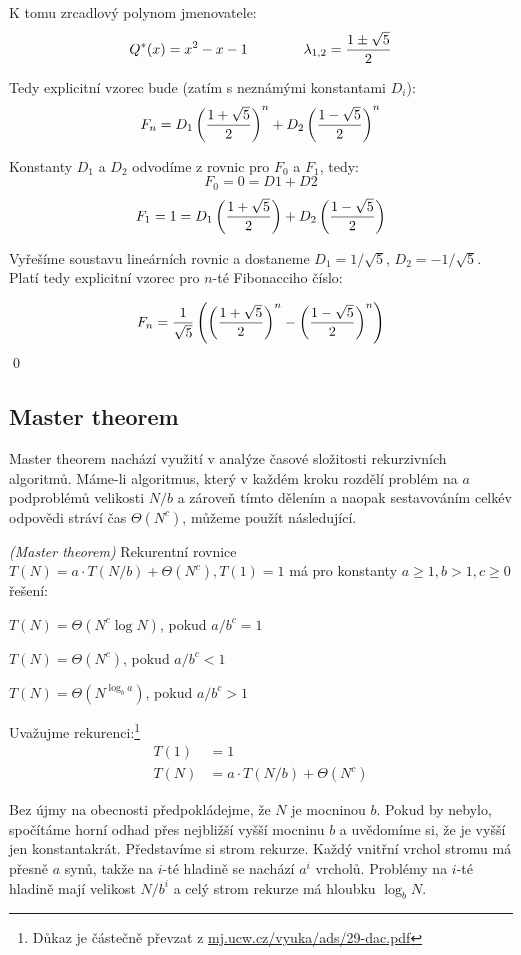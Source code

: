 K tomu zrcadlový polynom jmenovatele:
$$Q^*(x) = x^2-x-1\qquad\qquad\lambda_{1,2} = {1\pm\sqrt 5\over 2}$$

Tedy explicitní vzorec bude (zatím s neznámými konstantami $D_i$):
$$F_n = D_1\left({1+\sqrt 5\over 2}\right)^n + D_2\left({1-\sqrt 5\over 2}\right)^n$$

Konstanty $D_1$ a $D_2$ odvodíme z rovnic pro $F_0$ a $F_1$, tedy:
$$F_0 = 0 = D1 + D2$$
$$F_1 = 1 = D_1\left({1+\sqrt 5\over 2}\right) + D_2\left({1-\sqrt 5\over 2}\right)$$

Vyřešíme soustavu lineárních rovnic a dostaneme $D_1 = 1/\sqrt 5$, $D_2 =
-1/\sqrt 5$. Platí tedy explicitní vzorec pro $n$-té Fibonacciho číslo:

$$F_n = {1\over\sqrt 5}\left(\left({1+\sqrt 5\over 2}\right)^n - \left({1-\sqrt 5\over 2}\right)^n\right)$$
\qed

\subsection{Master theorem}

Master theorem nachází využití v analýze časové složitosti rekurzivních
algoritmů. Máme-li algoritmus, který v každém kroku rozdělí problém na $a$
podproblémů velikosti $N/b$ a zároveň tímto dělením a naopak sestavováním
celkév odpovědi stráví čas $\Theta(N^c)$, můžeme použít následující.

\vt \emph{(Master theorem)} Rekurentní rovnice $T(N) = a\cdot T(N/b) + \Theta(N^c), T(1) = 1$ má pro konstanty $a \ge 1, b > 1, c\ge 0$ řešení:
\begin{itemize*}
\item $T(N) = \Theta(N^c \log N)$, pokud $a/b^c = 1$
\item $T(N) = \Theta(N^c)$, pokud $a/b^c < 1$
\item $T(N) = \Theta(N^{\log_b a})$, pokud $a/b^c > 1$
\end{itemize*}

\dk Uvažujme rekurenci:\footnote{Důkaz je částečně převzat z \url{mj.ucw.cz/vyuka/ads/29-dac.pdf}}
\begin{align*}
T(1) &= 1 \\
T(N) &= a\cdot T(N/b) + \Theta(N^c)
\end{align*}

Bez újmy na obecnosti předpokládejme, že $N$ je mocninou $b$. Pokud by nebylo,
spočítáme horní odhad přes nejbližší vyšší mocninu $b$ a uvědomíme si, že je
vyšší jen konstantakrát. Představíme si strom rekurze. Každý vnitřní vrchol
stromu má přesně $a$ synů, takže na $i$-té hladině se nachází $a^i$ vrcholů.
Problémy na $i$-té hladině mají velikost $N/b^i$ a celý strom rekurze má
hloubku $\log_b N$.


